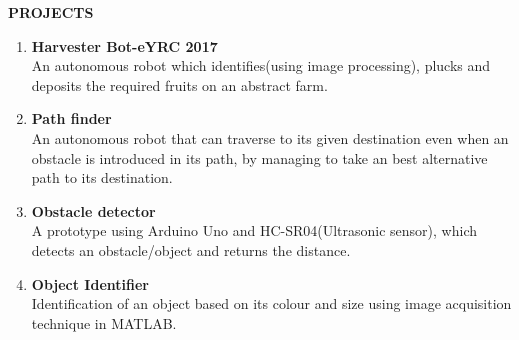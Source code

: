\documentclass[a4paper]{article}
\begin{document}
		\begin{flushleft}
		\vspace{5mm}
		\large{\textbf{PROJECTS}} 
		\vspace{0.5mm}
		\noindent\hrulefill
		\vspace{0.5mm}
	\end{flushleft}
	\begin{enumerate}
		\item \textbf{Harvester Bot-eYRC 2017}\\
		An autonomous robot which identifies(using image processing), plucks and deposits the required fruits on an abstract farm.  
		\item \textbf{Path finder}\\
		An autonomous robot that can traverse to its given destination even when an obstacle is introduced in its path, by managing to take an best alternative path to its destination.  
		\item \textbf{Obstacle detector}\\
		A prototype using Arduino Uno and HC-SR04(Ultrasonic sensor), which detects an obstacle/object and returns the distance.
		\item \textbf{Object Identifier}\\
		Identification of an object based on its colour and size using image acquisition technique in MATLAB.				 	              
	\end{enumerate}
\end{document}
